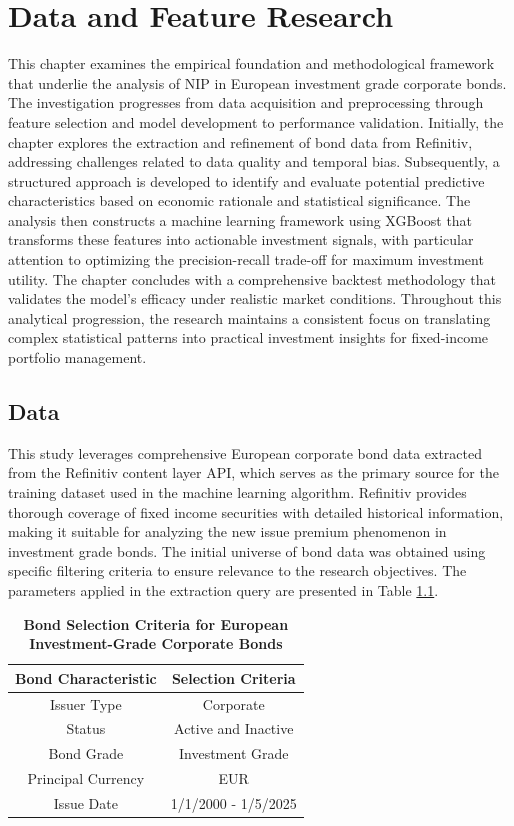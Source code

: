 \chapter{Data and Feature Research}
\label{ch:Data and Feature Research}

This chapter examines the empirical foundation and methodological framework that underlie the analysis of NIP in European investment grade corporate bonds. The investigation progresses from data acquisition and preprocessing through feature selection and model development to performance validation. Initially, the chapter explores the extraction and refinement of bond data from Refinitiv, addressing challenges related to data quality and temporal bias. Subsequently, a structured approach is developed to identify and evaluate potential predictive characteristics based on economic rationale and statistical significance. The analysis then constructs a machine learning framework using XGBoost that transforms these features into actionable investment signals, with particular attention to optimizing the precision-recall trade-off for maximum investment utility. The chapter concludes with a comprehensive backtest methodology that validates the model's efficacy under realistic market conditions. Throughout this analytical progression, the research maintains a consistent focus on translating complex statistical patterns into practical investment insights for fixed-income portfolio management.

\section{Data}
\label{sec:Data}

This study leverages comprehensive European corporate bond data extracted from the Refinitiv content layer API, which serves as the primary source for the training dataset used in the machine learning algorithm. Refinitiv provides thorough coverage of fixed income securities with detailed historical information, making it suitable for analyzing the new issue premium phenomenon in investment grade bonds. The initial universe of bond data was obtained using specific filtering criteria to ensure relevance to the research objectives. The parameters applied in the extraction query are presented in Table \ref{tab:filter_criteria}.

\begin{table}[h]
    \centering
    \small
    \begin{tabular}{cc}\toprule
         \textbf{Bond Characteristic}& \textbf{Selection Criteria}\\\midrule
         Issuer Type& Corporate\\
         Status& Active and Inactive\\
         Bond Grade& Investment Grade\\
         Principal Currency& EUR\\
         Issue Date& 1/1/2000 - 1/5/2025\\ \bottomrule
    \end{tabular}
    \caption{\textbf{Bond Selection Criteria for European Investment-Grade Corporate Bonds}}
    \label{tab:filter_criteria}
\end{table}

